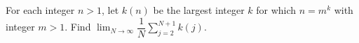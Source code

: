 For each integer $n>1$, let $k(n)$ be the largest integer $k$ for which $n=m^k$ with integer $m>1$. Find $\lim_{N\to\infty}\dfrac{1}{N}\sum_{j=2}^{N+1}k(j)$.
